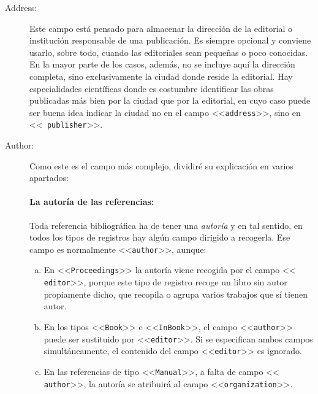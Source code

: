 \documentclass[a4paper,11pt]{article}
\def\ltr#1-{<<\texttt{#1}>>}
\begin{document}
\begin{description}

\item[Address:]  Este campo  está pensado  para almacenar  la dirección  de la
  editorial o institución responsable  de una publicación. Es siempre opcional
  y conviene usarlo,  sobre todo, cuando las editoriales  sean pequeñas o poco
  conocidas. En  la mayor parte  de los casos,  además, no se incluye  aquí la
  dirección completa, sino exclusivamente la ciudad donde reside la editorial.
  Hay  especialidades científicas  donde  es costumbre  identificar las  obras
  publicadas más bien  por la ciudad que por la editorial,  en cuyo caso puede
  ser buena idea indicar la ciudad no  en el campo \ltr address-, sino en \ltr
  publisher-.

\item[Author:] Como este es el  campo más complejo, dividiré su explicación en
  varios apartados:


  \paragraph{La autoría de las referencias:}
  \label{sec:la-autoria-de}

  Toda  referencia bibliográfica  ha  de  tener una  \emph{autoría}  y en  tal
  sentido,  en  todos  los tipos  de  registros  hay  algún campo  dirigido  a
  recogerla. Ese campo es normalmente \ltr author-, aunque:

  \begin{enumerate}[a)]

  \item  En \ltr  Proceedings- la  autoría viene  recogida por  el  campo \ltr
    editor-,  porque  este  tipo  de   registro  recoge  un  libro  sin  autor
    propiamente dicho,  que recopila  o agrupa varios  trabajos que  sí tienen
    autor.

  \item En  los tipos \ltr Book- e  \ltr InBook-, el campo  \ltr author- puede
    ser  sustituido  por  \ltr   editor-.   Si  se  especifican  ambos  campos
    simultáneamente, el contenido del campo \ltr editor- es ignorado.

  \item  En las  referencias  de tipo  \ltr  Manual-, a  falta  de campo  \ltr
    author-, la autoría se atribuirá al campo \ltr organization-.

  \end{enumerate}


\end{description}
\end{document}
